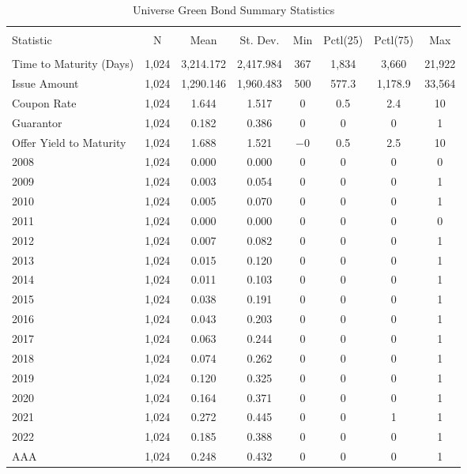 \begin{table}[!htbp] \centering 
  \caption{Universe Green Bond Summary Statistics} 
  \label{desc1} 
  \footnotesize
\begin{tabular}{@{\extracolsep{5pt}}lccccccc} 
\\[-1.8ex]\hline 
\hline \\[-1.8ex] 
Statistic & \multicolumn{1}{c}{N} & \multicolumn{1}{c}{Mean} & \multicolumn{1}{c}{St. Dev.} & \multicolumn{1}{c}{Min} & \multicolumn{1}{c}{Pctl(25)} & \multicolumn{1}{c}{Pctl(75)} & \multicolumn{1}{c}{Max} \\ 
\hline \\[-1.8ex] 
Time to Maturity (Days) & 1,024 & 3,214.172 & 2,417.984 & 367 & 1,834 & 3,660 & 21,922 \\ 
Issue Amount & 1,024 & 1,290.146 & 1,960.483 & 500 & 577.3 & 1,178.9 & 33,564 \\ 
Coupon Rate & 1,024 & 1.644 & 1.517 & 0 & 0.5 & 2.4 & 10 \\ 
Guarantor & 1,024 & 0.182 & 0.386 & 0 & 0 & 0 & 1 \\ 
Offer Yield to Maturity & 1,024 & 1.688 & 1.521 & $-$0 & 0.5 & 2.5 & 10 \\ 
2008 & 1,024 & 0.000 & 0.000 & 0 & 0 & 0 & 0 \\ 
2009 & 1,024 & 0.003 & 0.054 & 0 & 0 & 0 & 1 \\ 
2010 & 1,024 & 0.005 & 0.070 & 0 & 0 & 0 & 1 \\ 
2011 & 1,024 & 0.000 & 0.000 & 0 & 0 & 0 & 0 \\ 
2012 & 1,024 & 0.007 & 0.082 & 0 & 0 & 0 & 1 \\ 
2013 & 1,024 & 0.015 & 0.120 & 0 & 0 & 0 & 1 \\ 
2014 & 1,024 & 0.011 & 0.103 & 0 & 0 & 0 & 1 \\ 
2015 & 1,024 & 0.038 & 0.191 & 0 & 0 & 0 & 1 \\ 
2016 & 1,024 & 0.043 & 0.203 & 0 & 0 & 0 & 1 \\ 
2017 & 1,024 & 0.063 & 0.244 & 0 & 0 & 0 & 1 \\ 
2018 & 1,024 & 0.074 & 0.262 & 0 & 0 & 0 & 1 \\ 
2019 & 1,024 & 0.120 & 0.325 & 0 & 0 & 0 & 1 \\ 
2020 & 1,024 & 0.164 & 0.371 & 0 & 0 & 0 & 1 \\ 
2021 & 1,024 & 0.272 & 0.445 & 0 & 0 & 1 & 1 \\ 
2022 & 1,024 & 0.185 & 0.388 & 0 & 0 & 0 & 1 \\ 
AAA & 1,024 & 0.248 & 0.432 & 0 & 0 & 0 & 1 \\ 

\end{tabular}
\end{table}
